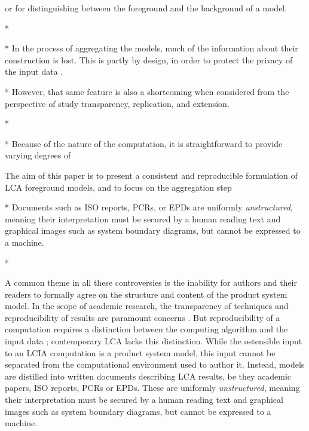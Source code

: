 or for distinguishing between the foreground and the background of a model.





 * 
 
 * In the process of aggregating the models, much of the information about their construction is lost.  This is partly by design, in order to protect the privacy of the input data \citep[Ch. 3]{UNEP_2011}.




 * However, that same feature is also a shortcoming when considered from the perspective of study transparency, replication, and extension.  


 * 

 * Because of the nature of the computation, it is straightforward to provide varying degrees of 

The aim of this paper is to present a consistent and reproducible formulation of LCA foreground models, and to focus on the aggregation step 








 * Documents such as ISO reports, PCRs, or EPDs are uniformly \textit{unstructured}, meaning their interpretation must be secured by a human reading text and graphical images such as system boundary diagrams, but cannot be expressed to a machine.  

 * 


\oldinput

A common theme in all these controversies is the inability for authors and their readers to formally agree on the structure and content of the product system model.  In the scope of academic research, the transparency of techniques and reproducibility of results are paramount concerns \citep{Mesirov_2010}.  But reproducibility of a computation requires a distinction between the computing algorithm and the input data \citep{Buckheit_1995, Fomel_2009}; contemporary LCA lacks this distinction.  While the ostensible input to an LCIA computation is a product system model, this input cannot be separated from the computational environment used to author it.  Instead, models are distilled into written documents describing LCA results, be they academic papers, ISO reports, PCRs or EPDs.  These are uniformly \textit{unstructured}, meaning their interpretation must be secured by a human reading text and graphical images such as system boundary diagrams, but cannot be expressed to a machine.  

